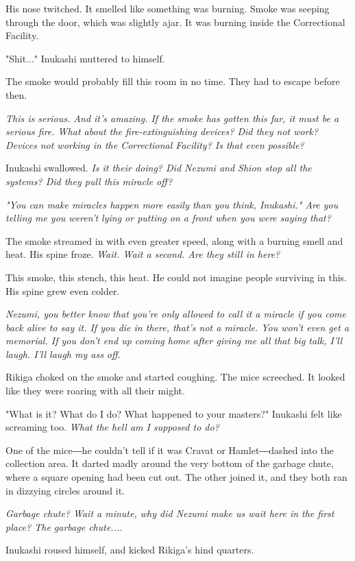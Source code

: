 His nose twitched. It smelled like something was burning. Smoke was
seeping through the door, which was slightly ajar. It was burning inside
the Correctional Facility.

"Shit..." Inukashi muttered to himself.

The smoke would probably fill this room in no time. They had to escape
before then.

\emph{This is serious. And it's amazing. If the smoke has gotten this far, it
	must be a serious fire. What about the fire-extinguishing devices? Did
	they not work? Devices not working in the Correctional Facility? Is that
	even possible?}

Inukashi swallowed. \emph{Is it their doing? Did Nezumi and Shion stop all the
	systems? Did they pull this miracle off?}

\emph{"You can make miracles happen more easily than you think, Inukashi." Are
	you telling me you weren't lying or putting on a front when you were
	saying that?}

The smoke streamed in with even greater speed, along with a burning
smell and heat. His spine froze. \emph{Wait. Wait a second. Are they still in
	here?}

This smoke, this stench, this heat. He could not imagine people
surviving in this. His spine grew even colder.

\emph{Nezumi, you better know that you're only allowed to call it a miracle if
	you come back alive to say it. If you die in there, that's not a
	miracle. You won't even get a memorial. If you don't end up coming home
	after giving me all that big talk, I'll laugh. I'll laugh my ass off.}

Rikiga choked on the smoke and started coughing. The mice screeched. It
looked like they were roaring with all their might.

"What is it? What do I do? What happened to your masters?" Inukashi felt
like screaming too. \emph{What the hell am I supposed to do?}

One of the mice―he couldn't tell if it was Cravat or Hamlet―dashed into
the collection area. It darted madly around the very bottom of the
garbage chute, where a square opening had been cut out. The other joined
it, and they both ran in dizzying circles around it.

\emph{Garbage chute? Wait a minute, why did Nezumi make us wait here in the
	first place? The garbage chute....}

Inukashi roused himself, and kicked Rikiga's hind quarters.

